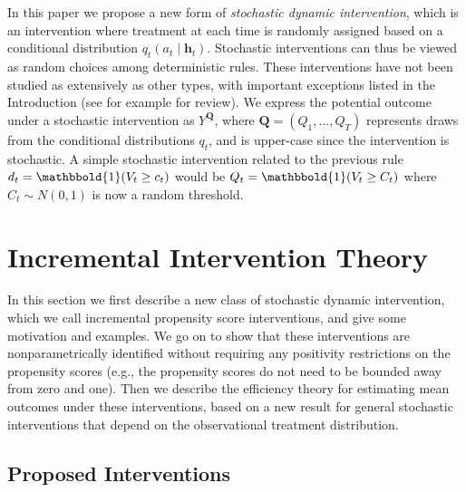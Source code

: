 \documentclass[12pt]{article}
\newcommand{\bh}{\mathbf{h}}
\newcommand{\one}{\mathbbold{1}}
\theoremstyle{remark}
\begin{document}
In this paper we propose a new form of \textit{stochastic dynamic intervention}, which is an intervention where treatment at each time is randomly assigned based on a conditional distribution $q_t(a_t \mid \bh_t)$. Stochastic interventions can thus be viewed as random choices among deterministic rules. These interventions have not been studied as extensively as other types, with important exceptions listed in the Introduction (see for example \textcite{diaz2012population, haneuse2013estimation, young2014identification} for review). We express the potential outcome under a stochastic intervention as $Y^{\textbf{Q}}$, where $\textbf{Q}=(Q_1,...,Q_T)$ represents draws from the conditional distributions $q_t$, and is upper-case since the intervention is stochastic. A simple stochastic intervention related to the previous rule $d_t=\one(V_t \geq c_t)$ would be $Q_t = \one(V_t \geq C_t)$ where $C_t \sim N(0,1)$ is now a random threshold.

\section{Incremental Intervention Theory}
\label{sec:ipsi}

In this section we first describe a new class of stochastic dynamic intervention, which we call incremental propensity score interventions, and give some motivation and examples. We go on to show that these interventions are nonparametrically identified without requiring any positivity restrictions on the propensity scores (e.g., the propensity scores do not need to be bounded away from zero and one). Then we describe the efficiency theory for estimating mean outcomes under these interventions, based on a new result for general stochastic interventions that depend on the observational treatment  distribution.

\subsection{Proposed Interventions}
\end{document}
